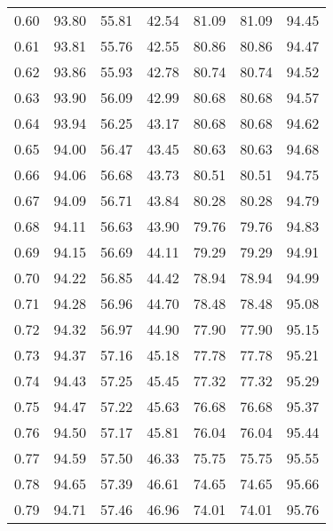 \begin{tabular}{|c|c|c|c|c|c|c|}
      0.60 &     93.80 &     55.81 &      42.54 &   81.09 &      81.09 &         94.45 \\
      0.61 &     93.81 &     55.76 &      42.55 &   80.86 &      80.86 &         94.47 \\
      0.62 &     93.86 &     55.93 &      42.78 &   80.74 &      80.74 &         94.52 \\
      0.63 &     93.90 &     56.09 &      42.99 &   80.68 &      80.68 &         94.57 \\
      0.64 &     93.94 &     56.25 &      43.17 &   80.68 &      80.68 &         94.62 \\
      0.65 &     94.00 &     56.47 &      43.45 &   80.63 &      80.63 &         94.68 \\
      0.66 &     94.06 &     56.68 &      43.73 &   80.51 &      80.51 &         94.75 \\
      0.67 &     94.09 &     56.71 &      43.84 &   80.28 &      80.28 &         94.79 \\
      0.68 &     94.11 &     56.63 &      43.90 &   79.76 &      79.76 &         94.83 \\
      0.69 &     94.15 &     56.69 &      44.11 &   79.29 &      79.29 &         94.91 \\
      0.70 &     94.22 &     56.85 &      44.42 &   78.94 &      78.94 &         94.99 \\
      0.71 &     94.28 &     56.96 &      44.70 &   78.48 &      78.48 &         95.08 \\
      0.72 &     94.32 &     56.97 &      44.90 &   77.90 &      77.90 &         95.15 \\
      0.73 &     94.37 &     57.16 &      45.18 &   77.78 &      77.78 &         95.21 \\
      0.74 &     94.43 &     57.25 &      45.45 &   77.32 &      77.32 &         95.29 \\
      0.75 &     94.47 &     57.22 &      45.63 &   76.68 &      76.68 &         95.37 \\
      0.76 &     94.50 &     57.17 &      45.81 &   76.04 &      76.04 &         95.44 \\
      0.77 &     94.59 &     57.50 &      46.33 &   75.75 &      75.75 &         95.55 \\
      0.78 &     94.65 &     57.39 &      46.61 &   74.65 &      74.65 &         95.66 \\
      0.79 &     94.71 &     57.46 &      46.96 &   74.01 &      74.01 &         95.76 \\

\end{tabular}
